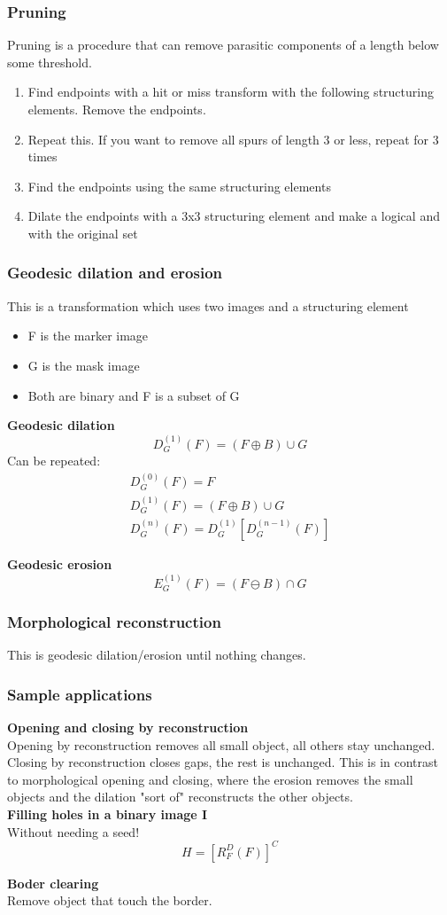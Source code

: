 \subsubsection{Pruning}
Pruning is a procedure that can remove parasitic components of a length below some threshold.\\
\begin{enumerate}
\item Find endpoints with a hit or miss transform with the following structuring elements. Remove the endpoints.
\item Repeat this. If you want to remove all spurs of length 3 or less, repeat for 3 times
\item Find the endpoints using the same structuring elements
\item Dilate the endpoints with a 3x3 structuring element and make a logical and with the original set
\end{enumerate}

\subsubsection{Geodesic dilation and erosion}
This is a transformation which uses two images and a structuring element
\begin{itemize}
\item F is the marker image
\item G is the mask image
\item Both are binary and F is a subset of G
\end{itemize}
\textbf{Geodesic dilation}
\[
	D_G^{(1)}(F) = (F\oplus B)\cup G
\]
Can be repeated:
\begin{align*}
	D_G^{(0)}(F) = F \\
	D_G^{(1)}(F) = (F\oplus B)\cup G\\
	D_G^{(n)}(F) = D_G^{(1)}[D_G^{(n-1)}(F)]
\end{align*}

\textbf{Geodesic erosion}
\[
	E_G^{(1)}(F) = (F\ominus B)\cap G
\]

\subsubsection{Morphological reconstruction}
This is geodesic dilation/erosion until nothing changes.

\subsubsection{Sample applications}
\textbf{Opening and closing by reconstruction}\\
Opening by reconstruction removes all small object, all others stay unchanged.
Closing by reconstruction closes gaps, the rest is unchanged. This is in contrast to morphological opening and closing, where the erosion removes the small objects and the dilation "sort of" reconstructs the other objects.\\

\textbf{Filling holes in a binary image I}\\
Without needing a seed!\\
\[
	H = [R_F^D(F)]^C
\]

\textbf{Boder clearing}\\
Remove object that touch the border.